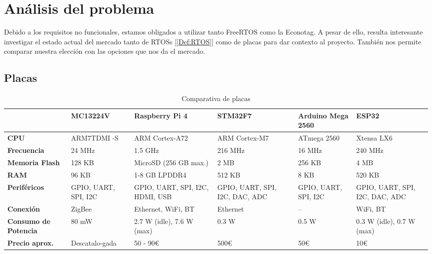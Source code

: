 \chapter{Análisis del problema}

Debido a los requisitos no funcionales, estamos obligados a utilizar tanto FreeRTOS como la Econotag. A pesar de ello, resulta interesante investigar el estado actual del mercado tanto de RTOSs [\ref{Def:RTOS}] como de placas para dar contexto al proyecto. También nos permite comparar nuestra elección con las opciones que nos da el mercado.

\section{Placas}
\begin{table}[!ht]
\centering
\renewcommand{\arraystretch}{1.2}
\begin{tabularx}{\textwidth}{|X|X|X|X|X|X|}
\hline
\textbf{} 			& \textbf{MC13224V} 	& \textbf{Raspberry Pi 4}	    & \textbf{STM32F7}			& \textbf{Arduino Mega 2560}    & \textbf{ESP32} 		 \\ \hline
\textbf{CPU} 			& ARM7TDMI -S 		& ARM Cortex-A72		    & ARM Cortex-M7   		    	& ATmega 2560			& Xtensa LX6 			 \\ \hline
\textbf{Frecuencia} 		& 24 MHz 		& 1.5 GHz			    & 216 MHz 	  		    	& 16 MHz		    	& 240 MHz			 \\ \hline
\textbf{Memoria Flash} 		& 128 KB 		& MicroSD (256 GB max.)		    & 2 MB 		  	    	& 256 KB 		    	& 4 MB				 \\ \hline
\textbf{RAM} 			& 96 KB 		& 1-8 GB LPDDR4 		    & 512 KB 	  		    	& 8 KB 			    	& 520 KB 			 \\ \hline
\textbf{Periféricos} 		& GPIO, UART, SPI, I2C 	& GPIO, UART, SPI, I2C, HDMI, USB   & GPIO, UART, SPI, I2C, DAC, ADC	& GPIO, UART, SPI, I2C 	    	& GPIO, UART, SPI, I2C, DAC, ADC \\ \hline
\textbf{Conexión} 		& ZigBee 		& Ethernet, WiFi, BT		    & Ethernet				& -- 			    	& WiFi, BT			 \\ \hline
\textbf{Consumo de Potencia} 	& 80 mW 		& 2.7 W (idle), 7.6 W (max) 	    & 0.3 W				& 0.5 W 		    	& 0.3 W (idle), 0.7 W (max) 	 \\ \hline
\textbf{Precio aprox.} 		& Descatalo-gada 	& 50 - 90€ 			    & 500€ 				& 50€			    	& 10€				 \\ \hline
\end{tabularx}
\caption{Comparativa de placas}
\label{Tab:placas}
\end{table}


